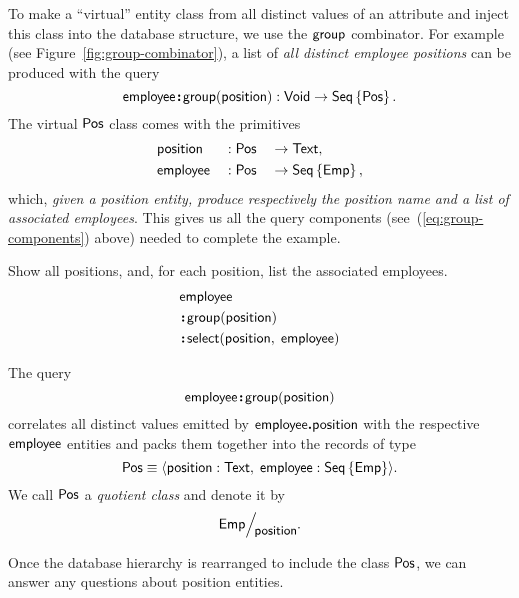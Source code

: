 To make a ``virtual'' entity class from all distinct values of an attribute and
inject this class into the database structure, we use the $\textup{\textsf{group}}$ combinator.
For example (see Figure~\ref{fig:group-combinator}), a list of \emph{all
distinct employee positions} can be produced with the query
\begin{equation*}
    \textup{\textsf{employee}}\!\boldsymbol{:}\!\textup{\textsf{group}}(\textup{\textsf{position}}) : \textup{\textsf{Void}} \to \textup{\textsf{Seq}}\left\{\textup{\textsf{Pos}}\right\}.
\end{equation*}
The virtual $\textup{\textsf{Pos}}$ class comes with the primitives
\begin{alignat*}{3}
    & \textup{\textsf{position}} && : \textup{\textsf{Pos}} && \to \textup{\textsf{Text}}, \\
    & \textup{\textsf{employee}} && : \textup{\textsf{Pos}} && \to \textup{\textsf{Seq}}\left\{\textup{\textsf{Emp}}\right\},
\end{alignat*}
which, \emph{given a position entity, produce respectively the position name
and a list of associated employees}.
This gives us all the query components (see~(\ref{eq:group-components}) above)
needed to complete the example.



\addtocounter{demo}{-1}
\begin{demo}
    Show all positions, and, for each position, list the associated employees.
    \begin{align*}
        & \textup{\textsf{employee}} \\
        & \!\boldsymbol{:}\!\textup{\textsf{group}}(\textup{\textsf{position}}) \\
        & \!\boldsymbol{:}\!\textup{\textsf{select}}(\textup{\textsf{position}},\; \textup{\textsf{employee}})
    \end{align*}
\end{demo}

The query
\begin{equation*}
    \textup{\textsf{employee}}\!\boldsymbol{:}\!\textup{\textsf{group}}(\textup{\textsf{position}})
\end{equation*}
correlates all distinct values emitted by $\textup{\textsf{employee}}\boldsymbol{.}\textup{\textsf{position}}$ with the
respective $\textup{\textsf{employee}}$ entities and packs them together into the records of
type
\begin{equation*}
    \textup{\textsf{Pos}} \equiv \langle \textup{\textsf{position}} : \textup{\textsf{Text}},\; \textup{\textsf{employee}} : \textup{\textsf{Seq}}\left\{\textup{\textsf{Emp}}\right\} \rangle.
\end{equation*}
We call $\textup{\textsf{Pos}}$ a \emph{quotient class} and denote it by
\begin{equation*}
    \Quotient{\Emp}{\Position}.
\end{equation*}

Once the database hierarchy is rearranged to include the class $\textup{\textsf{Pos}}$, we can
answer any questions about position entities.

